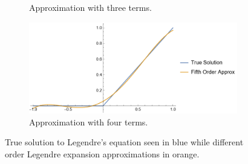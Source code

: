 \documentclass[12pt]{report}
\begin{document}
\begin{solution}
\begin{figure}[H]
\begin{subfigure}[b]{0.5\linewidth}
            \caption{Approximation with three terms.}
            \label{fig1:c}
            \vspace{4ex}
        \end{subfigure}%
        \begin{subfigure}[b]{0.5\linewidth}
            \centering
            \includegraphics[width=\linewidth]{images/3-4.png}
            \caption{Approximation with four terms.}
            \label{fig1:d}
            \vspace{4ex}
        \end{subfigure}
        \caption{True solution to Legendre's equation seen in blue while different order Legendre expansion approximations in orange. }
        \label{fig1}
    \end{figure}



\end{solution}

\newpage
\end{document}
